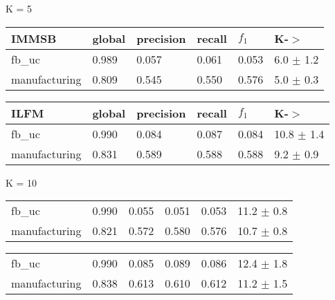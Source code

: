 

\begin{table*}[h] \label{table:real_pred}
\caption{Predictive Performance on a Real Datasets}
	\begin{minipage}[h]{0.45\linewidth} 
K = 5\hspace{5pt}
\begin{tabular}{llllll}
\hline
 IMMSB   &   global &   precision &   recall & $f_1$ &    K-\ensuremath{>} \\
\hline
 fb\_uc          &    0.989 &       0.057 &    0.061 &  0.053 &   6.0 $\pm$ 1.2 \\
 manufacturing  &    0.809 &       0.545 &    0.550 & 	0.576 &	5.0 $\pm$ 0.3 \\


\hline
\end{tabular}
\end{minipage}
\hspace{0.8cm}
\begin{minipage}[h]{0.45\linewidth}
\begin{tabular}{llllll}
\hline
  ILFM & global &   precision &   recall &   $f_1$ &   K-\ensuremath{>} \\
\hline
 fb\_uc            &    0.990 &       0.084 &    0.087 & 	0.084 &	10.8 $\pm$ 1.4 \\
 manufacturing    &    0.831 &       0.589 &    0.588 & 	0.588 &	9.2 $\pm$ 0.9 \\


\hline
\end{tabular}
\end{minipage}


	\begin{minipage}[h]{0.45\linewidth} 
K = 10
\begin{tabular}{llllll}
 fb\_uc          &    0.990 &       0.055 &    0.051 &	0.053 &	 11.2 $\pm$ 0.8 \\
 manufacturing  &    0.821 &       0.572 &    0.580 & 	0.576 &	10.7 $\pm$ 0.8 \\


\hline
\end{tabular}
\end{minipage}
\hspace{0.8cm}
\begin{minipage}[h]{0.45\linewidth}
\begin{tabular}{llllll}
 fb\_uc            &    0.990 &       0.085 &    0.089 & 	0.086 &	12.4 $\pm$ 1.8 \\
 manufacturing    &    0.838 &       0.613 &    0.610 & 	0.612 &	11.2 $\pm$ 1.5 \\



\end{tabular}
\end{minipage}
\end{table*}
